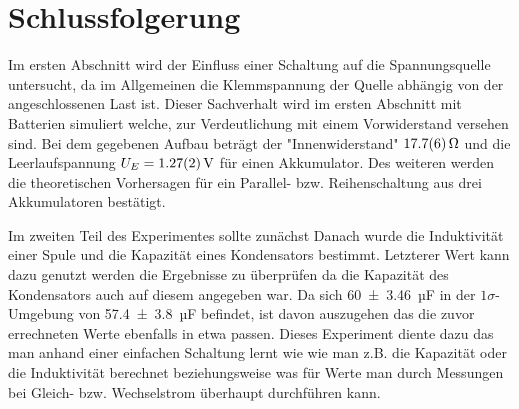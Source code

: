 
\section{Schlussfolgerung}


Im ersten Abschnitt wird der Einfluss einer Schaltung auf die Spannungsquelle untersucht, da im Allgemeinen die Klemmspannung der Quelle abhängig von der angeschlossenen Last ist. Dieser Sachverhalt wird im ersten Abschnitt mit Batterien simuliert welche, zur Verdeutlichung mit einem Vorwiderstand versehen sind. Bei dem gegebenen Aufbau beträgt der "Innenwiderstand" $\SI{17.7+-0.6}{\ohm}$ und die Leerlaufspannung $U_E=\SI{1.27+-0.02}{V}$ für einen Akkumulator. Des weiteren werden die theoretischen Vorhersagen für ein Parallel- bzw. Reihenschaltung aus drei Akkumulatoren bestätigt.

Im zweiten Teil des Experimentes sollte zunächst %
Danach wurde die Induktivität einer Spule und die Kapazität eines Kondensators bestimmt.
Letzterer Wert kann dazu genutzt werden die Ergebnisse zu überprüfen da die Kapazität des Kondensators auch auf diesem angegeben war.
Da sich \SI{60+-3.46}{µF} in der $1\sigma$-Umgebung von \SI{57.4+-3.8}{µF} befindet, ist davon auszugehen das die zuvor errechneten Werte ebenfalls in etwa passen.
Dieses Experiment diente dazu das man anhand einer einfachen Schaltung lernt wie wie man z.B. die Kapazität oder die Induktivität berechnet beziehungsweise was für Werte man durch Messungen bei Gleich- bzw. Wechselstrom überhaupt durchführen kann.











